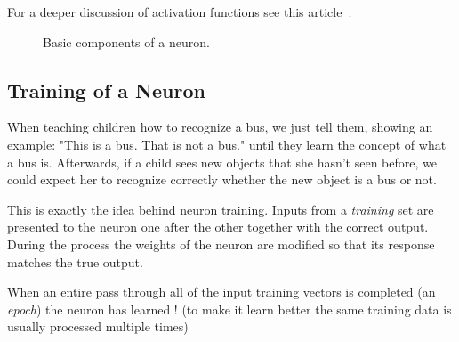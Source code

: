 For a deeper discussion of activation functions see this article~\cite{bib:activation_function}.

\begin{figure}[htb]
	\centering
	\caption{Basic components of a neuron.}
	\label{fig:sigmoid}
\end{figure}

\subsection{Training of a Neuron}
\label{training-of-a-neuron}

When teaching children how to recognize a bus, we just tell them, showing an example: "This is a bus. That is not a bus." until they learn the concept of what a bus is. Afterwards, if a child sees new objects that she hasn't seen before, we could expect her to recognize correctly whether the new object is a bus or not.

This is exactly the idea behind neuron training. Inputs from a \emph{training} set are presented to the neuron one after the other together with the correct output. During the process the weights of the neuron are modified so that its response matches the true output.

When an entire pass through all of the input training vectors is completed (an \emph{epoch}) the neuron has learned ! (to make it learn better the same training data is usually processed multiple times)

